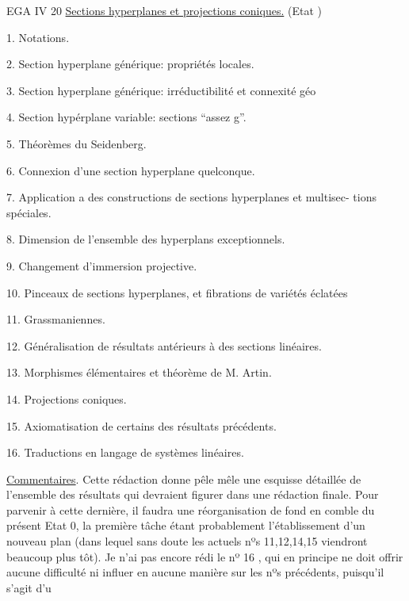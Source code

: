  

EGA IV 20 \quad \uline{Sections hyperplanes et projections coniques.} (Etat )

1. Notations.

2. Section hyperplane générique: propriétés locales.

3. Section hyperplane générique: irréductibilité et connexité géo

4. Section hypérplane variable: sections ``assez g''.

5. Théorèmes du Seidenberg.

6. Connexion d'une section hyperplane quelconque.

7. Application a des constructions de sections hyperplanes et multisec-%
tions spéciales.

8. Dimension de l'ensemble  des hyperplans exceptionnels.

9. Changement d'immersion projective.

10. Pinceaux de sections hyperplanes, et fibrations de variétés éclatées

11. Grassmaniennes.

12. Généralisation de résultats antérieurs à des sections linéaires.

13. Morphismes élémentaires et théorème de M. Artin.

14. Projections coniques.

15. Axiomatisation de certains des résultats précédents.

16. Traductions en langage de systèmes linéaires.

\uline{Commentaires}. Cette rédaction donne pêle mêle  une esquisse détaillée
de l'ensemble des résultats qui devraient figurer dans une rédaction
finale. Pour parvenir à cette dernière, il faudra une réorganisation de
fond en comble  du présent Etat 0, la première tâche étant probablement
l'établissement d'un nouveau plan (dans lequel sans doute  les actuels
nºs 11,12,14,15  viendront beaucoup plus tôt). Je n'ai pas encore rédi\unsure{-}
le nº 16 , qui en principe ne doit offrir aucune difficulté ni
influer en aucune manière sur les nºs précédents, puisqu'il s'agit d'u

